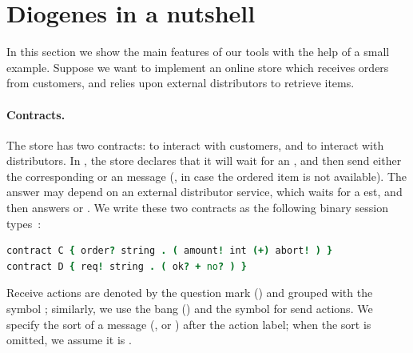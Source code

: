 \section{Diogenes in a nutshell}

In this section we show the main features of our tools
with the help of a small example.
Suppose we want to implement an online store which 
receives orders from customers,
and relies upon external distributors to retrieve items.

\paragraph{Contracts.}
The store has two contracts:
 to interact with customers, and
 to interact with distributors.
In , the store declares that it will wait for an ,
and then send either the corresponding  or an  message
(\eg, in case the ordered item is not available).
%
The answer may depend on an external distributor service, 
which waits for a est, and then answers  or .
% 
We write these two contracts as the following 
binary session types~\cite{Honda98esop}:
% 
\begin{lstlisting}[language=coco,basicstyle=\scriptsize\ttfamily]
contract C { order? string . ( amount! int (+) abort! ) }
contract D { req! string . ( ok? + no? ) }
\end{lstlisting}
Receive actions are denoted by the question mark () and grouped
with the symbol \code{+}; similarly, we use the
bang (\code{!}) and the symbol \code{(+)} for send actions. 
We specify the sort of a message 
(,  or )
after the action label;
when the sort is omitted, we assume it is .


